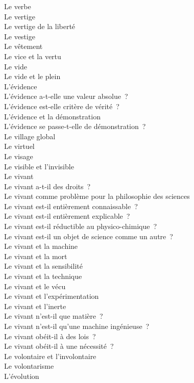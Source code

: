 \documentclass[a4paper,12pt]{article}
\begin{document}
Le verbe \\
Le vertige \\
Le vertige de la liberté \\
Le vestige \\
Le vêtement \\
Le vice et la vertu \\
Le vide \\
Le vide et le plein \\
L'évidence \\
L'évidence a-t-elle une valeur absolue ? \\
L'évidence est-elle critère de vérité ? \\
L'évidence et la démonstration \\
L'évidence se passe-t-elle de démonstration ? \\
Le village global \\
Le virtuel \\
Le visage \\
Le visible et l'invisible \\
Le vivant \\
Le vivant a-t-il des droits ? \\
Le vivant comme problème pour la philosophie des sciences \\
Le vivant est-il entièrement connaissable ? \\
Le vivant est-il entièrement explicable ? \\
Le vivant est-il réductible au physico-chimique ? \\
Le vivant est-il un objet de science comme un autre ? \\
Le vivant et la machine \\
Le vivant et la mort \\
Le vivant et la sensibilité \\
Le vivant et la technique \\
Le vivant et le vécu \\
Le vivant et l'expérimentation \\
Le vivant et l'inerte \\
Le vivant n'est-il que matière ? \\
Le vivant n'est-il qu'une machine ingénieuse ? \\
Le vivant obéit-il à des lois ? \\
Le vivant obéit-il à une nécessité ? \\
Le volontaire et l'involontaire \\
Le volontarisme \\
L'évolution \\
\end{document}

